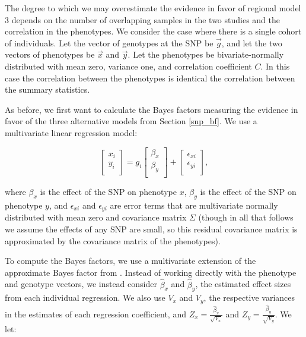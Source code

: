 \documentclass[11pt,titlepage]{article}
\begin{document}
The degree to which we may overestimate the evidence in favor of regional model 3 depends on the number of overlapping samples in the two studies and the correlation in the phenotypes. We consider the case where there is a single cohort of individuals. Let the vector of genotypes at the SNP be $\vec g$, and let the two vectors of phenotypes be $\vec x$ and $\vec y$. Let the phenotypes be bivariate-normally distributed with mean zero, variance one, and correlation coefficient $C$. In this case the correlation between the phenotypes is identical the correlation between the summary statistics.

As before, we first want to calculate the Bayes factors measuring the evidence in favor of the three alternative models from Section \ref{snp_bf}. We use a multivariate linear regression model:

\begin{equation}
 \begin{bmatrix}
     x_{i}        \\[0.3em]
       y_{i}     \\[0.3em]
     \end{bmatrix}
      = g_i 
      \begin{bmatrix}
     \beta_x        \\[0.3em]
       \beta_y     \\[0.3em]
     \end{bmatrix}
     + 
         \begin{bmatrix}
    \epsilon_{xi}      \\[0.3em]
      \epsilon_{yi}   \\[0.3em]
     \end{bmatrix},
\end{equation}

\noindent where $\beta_x$ is the effect of the SNP on phenotype $x$,  $\beta_y$ is the effect of the SNP on phenotype $y$, and $\epsilon_{xi}$ and $\epsilon_{yi}$ are error terms that are multivariate normally distributed with mean zero and covariance matrix $\Sigma$ (though in all that follows we assume the effects of any SNP are small, so this residual covariance matrix is approximated by the covariance matrix of the phenotypes). 

To compute the Bayes factors, we use a multivariate extension of the approximate Bayes factor from \citet{Wakefield:2008hc}. Instead of working directly with the phenotype and genotype vectors, we instead consider $\hat \beta_x$ and $\hat \beta_y$, the estimated effect sizes from each individual regression. We also use $V_x$ and $V_y$, the respective variances in the estimates of each regression coefficient, and $Z_x = \frac{\hat \beta_x}{\sqrt{V_x}}$ and  $Z_y = \frac{\hat \beta_y}{\sqrt{V_y}}$. We let:
\end{document}
